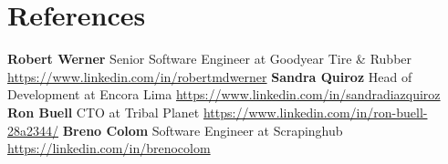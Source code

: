 \documentclass[11pt,a4paper,english]{moderncv}
\begin{document}
\section{References}
\cvlistitem
{
    \textbf{Robert Werner}
    \newline{}
    Senior Software Engineer at Goodyear Tire \& Rubber
    \newline{}
    \url{https://www.linkedin.com/in/robertmdwerner}
}
\cvlistitem
{
    \textbf{Sandra Quiroz}
    \newline{}
    Head of Development at Encora Lima
    \newline{}
    \url{https://www.linkedin.com/in/sandradiazquiroz}
}
\cvlistitem
{
    \textbf{Ron Buell}
    \newline{}
    CTO at Tribal Planet
    \newline{}
    \url{https://www.linkedin.com/in/ron-buell-28a2344/}
}
\cvlistitem
{
    \textbf{Breno Colom}
    \newline{}
    Software Engineer at Scrapinghub
    \newline{}
    \url{https://linkedin.com/in/brenocolom}
}
\end{document}
